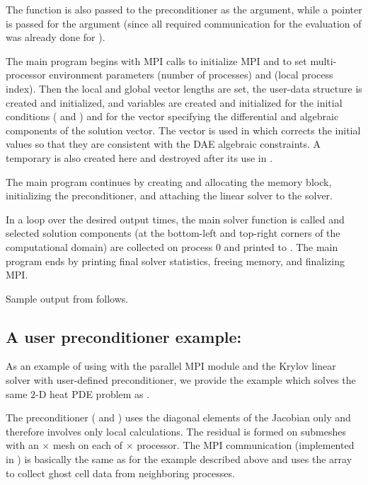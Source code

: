 The function  is also passed to the {\idabbdpre} preconditioner
as the  argument, while a  pointer is passed for the 
argument (since all required communication for the evaluation of  was
already done for ).

The main program begins with MPI calls to initialize MPI and to set
multi-processor environment parameters  (number of processes) and
 (local process index).  Then the local and global vector lengths
are set, the user-data structure  is created and initialized, and
 variables are created and initialized for the initial conditions
( and ) and for the vector  specifying the differential 
and algebraic components of the solution vector. The  vector is used
in  which corrects the initial values so that they are
consistent with the DAE algebraic constraints.
A temporary   is also created here and destroyed after
its use in .

The main program continues by creating and allocating the {\ida} memory
block, initializing the {\idabbdpre} preconditioner, and attaching the
{\idaspgmr} linear solver to the {\ida} solver.

In a loop over the desired output times, the main solver function 
is called and selected solution components (at the bottom-left and top-right
corners of the computational domain) are collected on process 0 and printed
to . The main program ends by printing final solver statistics,
freeing memory, and finalizing MPI.

Sample output from  follows.


\subsection{A user preconditioner example: }\label{ss:iheatpk}

As an example of using {\ida} with the parallel MPI {\nvecp} module and the Krylov 
linear solver {\idaspgmr} with user-defined preconditioner, we provide the example
 which solves the same 2-D heat PDE problem as . 

The preconditioner ( and ) uses the diagonal 
elements of the Jacobian only and therefore involves only local calculations. 
The residual is formed on submeshes with an  $\times$  mesh 
on each of  $\times$  processor. 
The MPI communication (implemented in ) is basically the same
as for the  example described above and uses the  array
to collect ghost cell data from neighboring processes.

